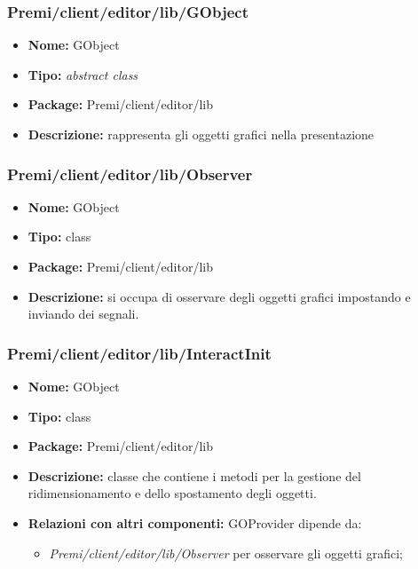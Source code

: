 \subsubsection{Premi/client/editor/lib/GObject}
\begin{itemize}
  \item[] \textbf{Nome:} GObject
  \item[] \textbf{Tipo:} \textit{abstract class}
  \item[] \textbf{Package:} Premi/client/editor/lib
  \item[] \textbf{Descrizione:} rappresenta gli oggetti grafici nella presentazione
\end{itemize}
\subsubsection{Premi/client/editor/lib/Observer}
\begin{itemize}
  \item[] \textbf{Nome:} GObject
  \item[] \textbf{Tipo:} class
  \item[] \textbf{Package:} Premi/client/editor/lib
  \item[] \textbf{Descrizione:} si occupa di osservare degli oggetti grafici impostando e inviando dei segnali.
\end{itemize}
\subsubsection{Premi/client/editor/lib/InteractInit}
\begin{itemize}
  \item[] \textbf{Nome:} GObject
  \item[] \textbf{Tipo:} class
  \item[] \textbf{Package:} Premi/client/editor/lib
  \item[] \textbf{Descrizione:} classe che contiene i metodi per la gestione del ridimensionamento e dello spostamento degli oggetti.
  \item[] \textbf{Relazioni con altri componenti:} GOProvider dipende da:
  \begin{itemize}
  	\item \textit{Premi/client/editor/lib/Observer} per osservare gli oggetti grafici;
  \end{itemize}
\end{itemize}
